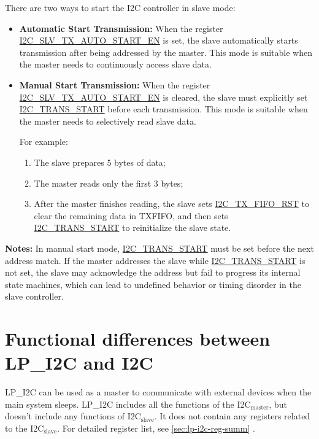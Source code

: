 \documentclass[main\_\_EN.tex]{subfiles}
\begin{document}
There are two ways to start the I2C controller in slave mode:

\begin{itemize}
  \item \textbf{Automatic Start Transmission:}
  When the register \hyperref[fielddesc:I2CSLVTXAUTOSTARTEN]{I2C\_SLV\_TX\_AUTO\_START\_EN} is set, the slave automatically starts transmission after being addressed by the master.
  This mode is suitable when the master needs to continuously access slave data.

  \item \textbf{Manual Start Transmission:}
  When the register \hyperref[fielddesc:I2CSLVTXAUTOSTARTEN]{I2C\_SLV\_TX\_AUTO\_START\_EN} is cleared, the slave must explicitly set \hyperref[fielddesc:I2CTRANSSTART]{I2C\_TRANS\_START} before each transmission.
  This mode is suitable when the master needs to selectively read slave data.

  For example:
  \begin{enumerate}
    \item The slave prepares 5 bytes of data;
    \item The master reads only the first 3 bytes;
    \item After the master finishes reading, the slave sets \hyperref[fielddesc:I2CTXFIFORST]{I2C\_TX\_FIFO\_RST} to clear the remaining data in TXFIFO, and then sets \hyperref[fielddesc:I2CTRANSSTART]{I2C\_TRANS\_START} to reinitialize the slave state.
  \end{enumerate}
\end{itemize}

{\bfseries Notes:}
In manual start mode, \hyperref[fielddesc:I2CTRANSSTART]{I2C\_TRANS\_START} must be set before the next address match. If the master addresses the slave while \hyperref[fielddesc:I2CTRANSSTART]{I2C\_TRANS\_START} is not set, the slave may acknowledge the address but fail to progress its internal state machines, which can lead to undefined behavior or timing disorder in the slave controller.

\section{Functional differences between LP\_I2C and I2C}


LP\_I2C can be used as a master to communicate with external devices when the main system sleeps. LP\_I2C includes all the functions of the \chipname{} I2C$_\text{master}$, but doesn't include any functions of \chipname{} I2C$_\text{slave}$. It does not contain any registers related to the I2C$_\text{slave}$. For detailed register list, see \ref{sec:lp-i2c-reg-summ} .
\end{document}
